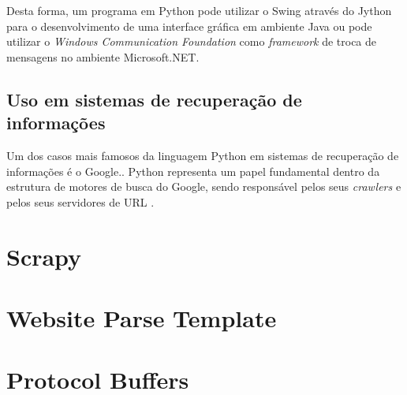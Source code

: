 Desta forma, um programa em Python pode utilizar o Swing através do Jython para o desenvolvimento de uma interface gráfica em ambiente Java ou pode utilizar o \emph{Windows Communication Foundation} como \emph{framework} de troca de mensagens no ambiente Microsoft.NET.

\subsection{Uso em sistemas de recuperação de informações}

Um dos casos mais famosos da linguagem Python em sistemas de recuperação de informações é o Google.\cite{google}. Python representa um papel fundamental dentro da estrutura de motores de busca do Google, sendo responsável pelos seus \emph{crawlers} e pelos seus servidores de URL \cite{surveyir} .



\pagebreak
\section{Scrapy}

\pagebreak
\section{Website Parse Template}

\pagebreak
\section{Protocol Buffers}
